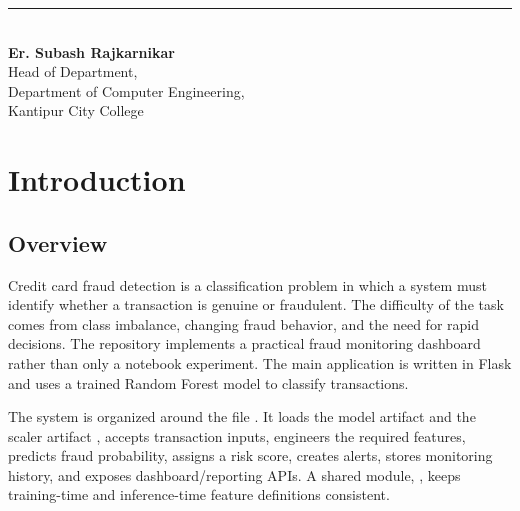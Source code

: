 \documentclass[12pt,a4paper]{report}
\newcommand{\department}{Department of Computer Engineering}
\newcommand{\college}{Kantipur City College}
\begin{document}
\vspace{2cm}
\noindent\rule{5cm}{0.4pt}\\[0.2cm]
\textbf{Er. Subash Rajkarnikar}\\
Head of Department,\\
\department,\\
\college

\newpage

\tableofcontents
\newpage

\begingroup
\makeatletter
\let\addvspace\@gobble
\makeatother
\listoffigures
\endgroup
\newpage

\begingroup
\makeatletter
\let\addvspace\@gobble
\makeatother
\listoftables
\endgroup
\newpage

\setcounter{page}{1}
\pagestyle{fancy}
\fancyhf{}
\fancyhead[L]{\nouppercase{\leftmark}}
\fancyfoot[C]{\thepage}
\renewcommand{\headrulewidth}{0.4pt}
\fancypagestyle{plain}{
    \fancyhf{}
    \fancyfoot[C]{\thepage}
    \renewcommand{\headrulewidth}{0pt}
}

\chapter{Introduction}

\section{Overview}
Credit card fraud detection is a classification problem in which a system must identify whether a transaction is genuine or fraudulent. The difficulty of the task comes from class imbalance, changing fraud behavior, and the need for rapid decisions. The repository implements a practical fraud monitoring dashboard rather than only a notebook experiment. The main application is written in Flask and uses a trained Random Forest model to classify transactions.

The system is organized around the file . It loads the model artifact  and the scaler artifact , accepts transaction inputs, engineers the required features, predicts fraud probability, assigns a risk score, creates alerts, stores monitoring history, and exposes dashboard/reporting APIs. A shared module, , keeps training-time and inference-time feature definitions consistent.
\end{document}
